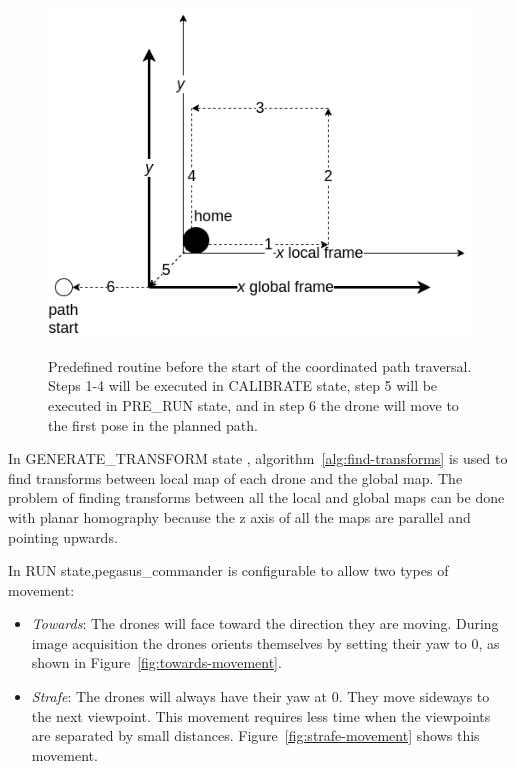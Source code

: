 \begin{figure}
	\centering
	\caption[Predefined routine before the start of the coordinated path traversal.]{\small Predefined routine before the start of the coordinated path traversal. Steps 1-4 will be executed in CALIBRATE state, step 5 will be executed in PRE\_RUN state, and in step 6 the drone will move to the first pose in the planned path.} 
	\includegraphics[width=5in]{figures/methodology/methodology-calibration-routine}
	\label{fig:calibration-routine}
\end{figure}

In GENERATE\_TRANSFORM state , algorithm~\ref{alg:find-transforms} is used to find transforms between local map of each drone and the global map. The problem of finding transforms between all the local and global maps can be done with planar homography because the z axis of all the maps are parallel and pointing upwards.

In RUN state,pegasus\_commander is configurable to allow two types of movement:
\begin{itemize}
	\item \textit{Towards}: The drones will face toward the direction they are moving. During image acquisition the drones orients themselves by setting their yaw to 0\degree, as shown in Figure~\ref{fig:towards-movement}.
	\item \textit{Strafe}: The drones will always have their yaw at 0\degree. They move sideways to the next viewpoint. This movement requires less time when the viewpoints are separated by small distances. Figure~\ref{fig:strafe-movement} shows this movement.
\end{itemize}

